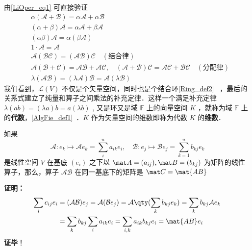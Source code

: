 由\autoref{LiOper_eq1} 可直接验证
\begin{equation}
\begin{aligned}
&\alpha(\mathcal{A+B})=\alpha\mathcal{A}+\alpha\mathcal{B}\\
&(\alpha+\beta)\mathcal{A}=\alpha\mathcal{A}+\beta\mathcal{A}\\
&(\alpha\beta)\mathcal{A}=\alpha(\beta\mathcal{A})\\
&1\cdot \mathcal{A}=\mathcal A\\
&\mathcal{A}(\mathcal{BC})=(\mathcal{AB})\mathcal C\quad(\text{结合律})\\
&\mathcal A(\mathcal{B+C})=\mathcal{AB+AC},\quad (\mathcal{A+B})\mathcal C=\mathcal{AC+BC}\quad(\text{分配律})\\
&\lambda(\mathcal{AB})=(\lambda\mathcal{A})\mathcal{B}=\mathcal{A}(\lambda \mathcal B)
\end{aligned}
\end{equation}
我们看到，$\mathcal{L}(V)$ 不仅是个矢量空间，同时也是个结合环\autoref{Ring_def2}~ ，最后的关系式建立了纯量和算子之间乘法的补充定律．这样一个满足补充定律 $\lambda(ab)=(\lambda a)b=a(\lambda b)$ , 又是环又是域 $\mathbb{F}$ 上的向量空间 $K$ ，就称为域 $\mathbb{F}$ 上的\textbf{代数}，\autoref{AlgFie_def1}~．$K$ 作为矢量空间的维数即称为代数 $K$ 的\textbf{维数}．

\begin{theorem}{}\label{LiOper_the1}
如果
\begin{equation}\label{LiOper_eq2}
\mathcal{A}: e_k\mapsto \mathcal{A} e_k=\sum_i^{n}a_{ik} e_i,\quad \mathcal{B}: e_j\mapsto  \mathcal{B} e_j=\sum_{k=1}^n b_{kj} e_k
\end{equation}
是线性空间 $V$ 在基底 $( e_i)$ 之下以 $\mat A=(a_{ij}), \mat B=(b_{kj})$ 为矩阵的线性算子，那么，算子 $\mathcal{AB}$ 在同一基底下的矩阵是 $\mat C=\mat{AB}$
\end{theorem}
\textbf{证明：}
\begin{equation}
\begin{aligned}
\sum_i c_{ij} e_i&=(\mathcal{AB}) e_j=\mathcal{A}(\mathcal{B} e_j)=\mathcal{A}\qty(\sum_k b_{kj} e_k)=\sum_k b_{kj}\mathcal{A} e_k\\
&=\sum_k b_{kj}\sum_i a_{ik} e_i=\sum_{i,k}a_{ik}b_{kj} e_i=\mat{AB} e_i
\end{aligned}
\end{equation}
\textbf{证毕}！

